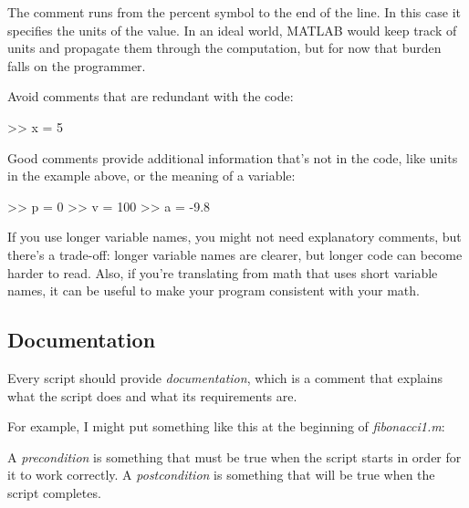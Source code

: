 The comment runs from the percent symbol to the end of the line.
In this case it specifies the units of the value.  In an ideal world,
MATLAB would keep track of units and propagate them through the
computation, but for now that burden falls on the programmer.


Avoid comments that are redundant with the code:

\begin{code}
>> x = 5        %
\end{code}

Good comments provide additional information that's not in the
code, like units in the example above, or the meaning of a variable:

\begin{code}
>> p = 0         %
>> v = 100       %
>> a = -9.8      %
\end{code}

If you use longer variable names, you might not need explanatory
comments, but there's a trade-off: longer variable names are clearer, but longer code can become harder
to read.
Also, if you're translating from math
that uses short variable names, it can be useful to make your
program consistent with your math.


\subsection{Documentation}

Every script should provide \emph{documentation}, which is a comment
that explains what the script does and what its requirements are.

For example, I might put something like this at the beginning of \emph{fibonacci1.m}:


\begin{code}
\end{code}

A \emph{precondition} is something that must be true when the script
starts in order for it to work correctly.  A \emph{postcondition}
is something that will be true when the script completes.

